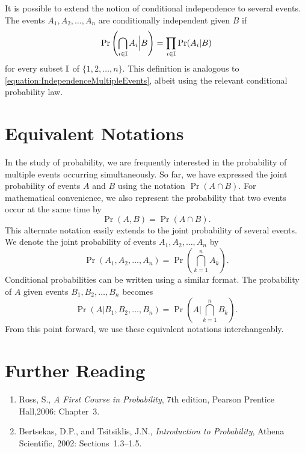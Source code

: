 It is possible to extend the notion of conditional independence to several events.
The events $A_1, A_2, \ldots, A_n$ are conditionally independent given $B$ if
\begin{equation*}
\Pr \left( \bigcap_{i \in \mathbb{I}} A_i \Big| B \right)
= \prod_{i \in \mathbb{I}} \Pr (A_i | B)
\end{equation*}
for every subset $\mathbb{I}$ of $\{1, 2, \ldots, n\}$.
This definition is analogous to \eqref{equation:IndependenceMultipleEvents}, albeit using the relevant conditional probability law.


\section{Equivalent Notations}

In the study of probability, we are frequently interested in the probability of multiple events occurring simultaneously.
So far, we have expressed the joint probability of events $A$ and $B$ using the notation $\Pr (A \cap B)$.
For mathematical convenience, we also represent the probability that two events occur at the same time by
\begin{equation*}
\Pr (A, B) = \Pr (A \cap B) .
\end{equation*}
This alternate notation easily extends to the joint probability of several events.
We denote the joint probability of events $A_1, A_2, \ldots, A_n$ by
\begin{equation*}
\Pr (A_1, A_2, \ldots, A_n) =
\Pr \left( \bigcap_{k=1}^n A_k \right) .
\end{equation*}
Conditional probabilities can be written using a similar format.
The probability of $A$ given events $B_1, B_2, \ldots, B_n$ becomes
\begin{equation*}
\Pr (A | B_1, B_2, \ldots, B_n) =
\Pr \left( A \bigg| \bigcap_{k=1}^n B_k \right) .
\end{equation*}
From this point forward, we use these equivalent notations interchangeably.


\section*{Further Reading}

\begin{small}
\begin{enumerate}
\item Ross, S., \emph{A First Course in Probability}, 7th edition, Pearson Prentice Hall,2006: Chapter~3.
\item Bertsekas, D.P., and Tsitsiklis, J.N., \emph{Introduction to Probability}, Athena Scientific, 2002: Sections~1.3--1.5.
\end{enumerate}
\end{small}

